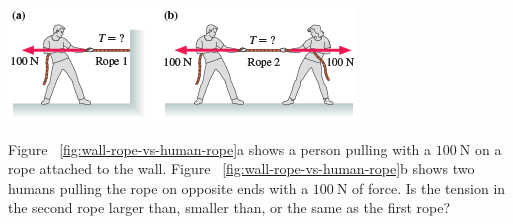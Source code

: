 \begin{Exercise}[title={Pulling a rope}, label={ex:pulling-a-rope}
    origin={Knight}]
    \begin{minipage}[t]
        {0.4\linewidth}
        \vspace{-2ex} \includegraphics{../figures/wall-rope-vs-human-rope.png}
        \label{fig:wall-rope-vs-human-rope}
    \end{minipage}

    Figure~%
    \ref{fig:wall-rope-vs-human-rope}a shows a person pulling with a
    $
        \qty{100}{\newton}
    $ on a rope attached to the wall.  Figure~%
    \ref{fig:wall-rope-vs-human-rope}b shows two humans pulling the rope
    on opposite ends with a
    $
        \qty{100}{\newton}
    $ of force.  Is the tension in the second rope larger than, smaller
    than, or the same as the first rope?
\end{Exercise}

